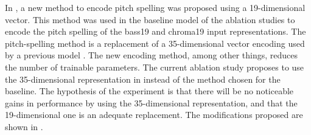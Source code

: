 
In , a new method to
encode pitch spelling was proposed using a 19-dimensional
vector. This method was used in the baseline model of the
ablation studies to encode the pitch spelling of the
\gls{bass19} and \gls{chroma19} input representations. The
pitch-spelling method is a replacement of a 35-dimensional
vector encoding used by a previous model
\parencite{micchi2021deep}. The new encoding method, among
other things, reduces the number of trainable parameters.
The current ablation study proposes to use the
35-dimensional representation in \textcite{micchi2021deep}
instead of the method chosen for the baseline. The
hypothesis of the experiment is that there will be no
noticeable gains in performance by using the 35-dimensional
representation, and that the 19-dimensional one is an
adequate replacement. The modifications proposed are shown
in .

